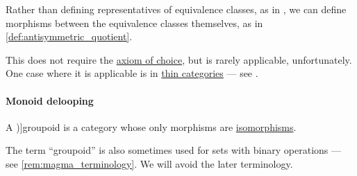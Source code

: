 \begin{remark}\label{rem:skeletons_and_preorder_categories}
  Rather than defining representatives of equivalence classes, as in , we can define morphisms between the equivalence classes themselves, as in \cref{def:antisymmetric_quotient}.

  This does not require the \hyperref[def:zfc/choice]{axiom of choice}, but is rarely applicable, unfortunately. One case where it is applicable is in \hyperref[def:thin_category]{thin categories} --- see .
\end{remark}

\paragraph{Monoid delooping}

\begin{definition}\label{def:groupoid}
  A \term[ru=группоид (\cite[30]{ЦаленкоШульгейфер1974ОсновыТеорииКатегорий})]{groupoid} is a category whose only morphisms are \hyperref[def:morphism_invertibility/isomorphism]{isomorphisms}.
\end{definition}
\begin{comments}
  \item The term \enquote{groupoid} is also sometimes used for sets with binary operations --- see \cref{rem:magma_terminology}. We will avoid the later terminology.
\end{comments}

